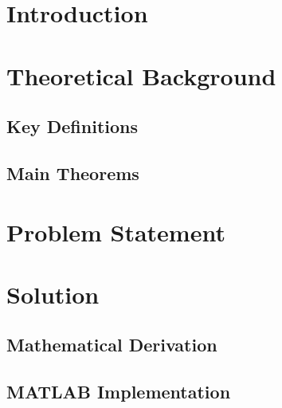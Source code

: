 \documentclass[12pt,a4paper]{article}
\newcommand{\mfile}[2]{%
  \vspace{0.3cm}%
  \vspace{0.4cm}%
}
\begin{document}
\newpage
\tableofcontents
\newpage


\section{Introduction}


\section{Theoretical Background}

\subsection{Key Definitions}

\subsection{Main Theorems}

\section{Problem Statement}

\section{Solution}

\subsection{Mathematical Derivation}

\subsection{MATLAB Implementation}

\mfile{index.m}                      {./src/index.m}
\mfile{process\_single\_image.m}     {./src/process_single_image.m}
\mfile{compress\_image\_svd.m}       {./src/compress_image_svd.m}
\mfile{compress\_channel\_svd.m}     {./src/compress_channel_svd.m}
\mfile{custom\_svd.m}                {./src/custom_svd.m}
\mfile{calculate\_frobenius\_error.m}{./src/calculate_frobenius_error.m}
\mfile{calculate\_data\_retention.m} {./src/calculate_data_retention.m}
\mfile{test.m}                       {./src/test.m}
\end{document}
